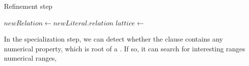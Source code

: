 \begin{algorithm}[!h]
 \caption{Refinement step}
 \label{alg3}
  $newRelation \leftarrow newLiteral.relation$
   {
    $lattice \leftarrow $
  } 
 
\end{algorithm}

%			


In the specialization step, we can detect whether the clause contains any numerical property, which is root of a
\graphname. If so, it can search for interesting ranges numerical ranges, 

